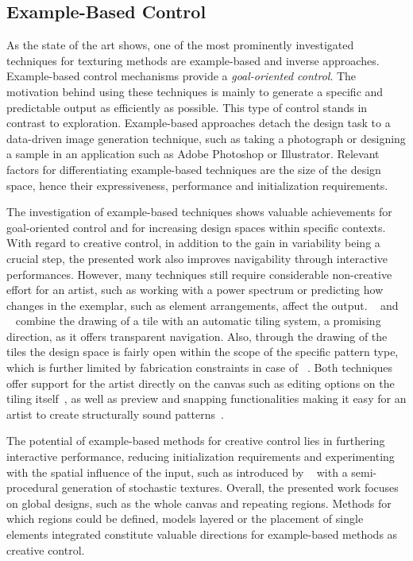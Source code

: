 \subsection{Example-Based Control}
\label{subsubsec:analysis_creative_means_example}

As the state of the art shows, one of the most prominently investigated techniques for texturing methods are example-based and inverse approaches. Example-based control mechanisms provide a \textit{goal-oriented control}. The motivation behind using these techniques is mainly to generate a specific and predictable output as efficiently as possible. This type of control stands in contrast to exploration. Example-based approaches detach the design task to a data-driven image generation technique, such as taking a photograph or designing a sample in an application such as Adobe Photoshop or Illustrator. Relevant factors for differentiating example-based techniques are the size of the design space, hence their expressiveness, performance and initialization requirements. 

The investigation of example-based techniques shows valuable achievements for goal-oriented control and for increasing design spaces within specific contexts. With regard to creative control, in addition to the gain in variability being a crucial step, the presented work also improves navigability through interactive performances. However, many techniques still require considerable non-creative effort for an artist, such as working with a power spectrum or predicting how changes in the exemplar, such as element arrangements, affect the output. \citeauthor*{tu_2020_cct}~\cite{tu_2020_cct} and \citeauthor*{bian_2018_tpd}~\cite{bian_2018_tpd} combine the drawing of a tile with an automatic tiling system, a promising direction, as it offers transparent navigation. Also, through the drawing of the tiles the design space is fairly open within the scope of the specific pattern type, which is further limited by fabrication constraints in case of \citeauthor*{bian_2018_tpd}~\cite{bian_2018_tpd}. Both techniques offer support for the artist directly on the canvas such as editing options on the tiling itself~\cite{tu_2020_cct}, as well as preview and snapping functionalities making it easy for an artist to create structurally sound patterns~\cite{bian_2018_tpd}. 

The potential of example-based methods for creative control lies in furthering interactive performance, reducing initialization requirements and experimenting with the spatial influence of the input, such as introduced by \citeauthor*{guehl_2020_stu}~\cite{guehl_2020_stu} with a semi-procedural generation of stochastic textures. Overall, the presented work focuses on global designs, such as the whole canvas and repeating regions. Methods for which regions could be defined, models layered or the placement of single elements integrated constitute valuable directions for example-based methods as creative control.


